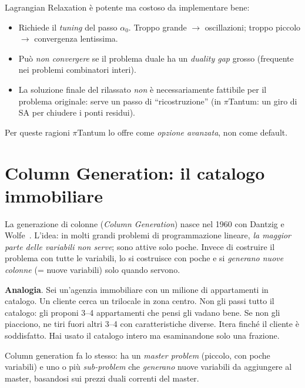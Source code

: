 \begin{avvertenzabox}
Lagrangian Relaxation \`e potente ma costoso da
implementare bene:
\begin{itemize}
\item Richiede il \emph{tuning} del passo $\alpha_0$.
  Troppo grande $\to$ oscillazioni; troppo piccolo $\to$
  convergenza lentissima.
\item Pu\`o \emph{non convergere} se il problema duale ha
  un \emph{duality gap} grosso (frequente nei problemi
  combinatori interi).
\item La soluzione finale del rilassato \emph{non} \`e
  necessariamente fattibile per il problema originale:
  serve un passo di ``ricostruzione'' (in $\pi$Tantum: un
  giro di SA per chiudere i ponti residui).
\end{itemize}

Per queste ragioni $\pi$Tantum lo offre come \emph{opzione
avanzata}, non come default.
\end{avvertenzabox}

\section{Column Generation: il catalogo immobiliare}

\begin{storiabox}
La generazione di colonne (\emph{Column Generation}) nasce
nel 1960 con Dantzig e Wolfe~\parencite{dantzig1960}.
L'idea: in molti grandi problemi di programmazione lineare,
\emph{la maggior parte delle variabili non serve}; sono
attive solo poche. Invece di costruire il problema con
tutte le variabili, lo si costruisce con poche e si
\emph{generano nuove colonne} (= nuove variabili) solo
quando servono.
\end{storiabox}

\begin{ideabox}
\textbf{Analogia}. Sei un'agenzia immobiliare con un milione
di appartamenti in catalogo. Un cliente cerca un trilocale
in zona centro. Non gli passi tutto il catalogo: gli
proponi 3--4 appartamenti che pensi gli vadano bene.
Se non gli piacciono, ne tiri fuori altri 3--4 con
caratteristiche diverse. Itera finch\'e il cliente \`e
soddisfatto. Hai usato il catalogo intero ma esaminandone
solo una frazione.

Column generation fa lo stesso: ha un \emph{master problem}
(piccolo, con poche variabili) e uno o pi\`u \emph{sub-problem}
che \emph{generano} nuove variabili da aggiungere al master,
basandosi sui prezzi duali correnti del master.
\end{ideabox}

